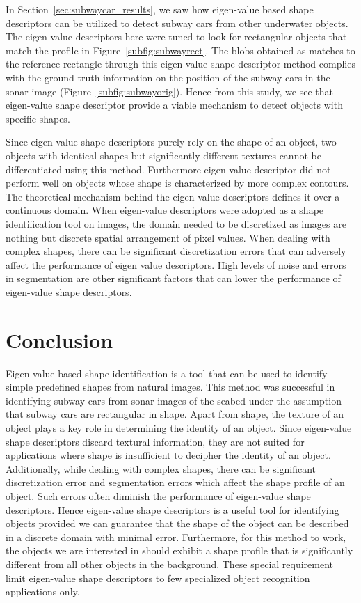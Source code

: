 \documentclass {udthesis}
\begin{document}
In Section~\ref{sec:subwaycar_results}, we saw how eigen-value based shape descriptors can be utilized to detect subway cars from other underwater objects. The eigen-value descriptors here were tuned to look for rectangular objects that match the profile in Figure~\ref{subfig:subwayrect}. The blobs obtained as matches to the reference rectangle through this eigen-value shape descriptor method complies with the ground truth information on the position of the subway cars in the sonar image (Figure~\ref{subfig:subwayorig}). Hence from this study, we see that eigen-value shape descriptor provide a viable mechanism to detect objects with specific shapes.

Since eigen-value shape descriptors purely rely on the shape of an object, two objects with identical shapes but significantly different textures cannot be differentiated using this method. Furthermore eigen-value descriptor did not perform well on objects whose shape is characterized by more complex contours. The theoretical mechanism behind the eigen-value descriptors defines it over a continuous domain. When eigen-value descriptors were adopted as a shape identification tool on images, the domain needed to be discretized as images are nothing but discrete spatial arrangement of pixel values. When dealing with complex shapes, there can be significant discretization errors that can adversely affect the performance of eigen value descriptors. High levels of noise and errors in segmentation are other significant factors that can lower the performance of eigen-value shape descriptors.


\section{Conclusion}

Eigen-value based shape identification is a tool that can be used to identify simple predefined shapes from natural images. This method was successful in identifying subway-cars from sonar images of the seabed under the assumption that subway cars are rectangular in shape. Apart from shape, the texture of an object plays a key role in determining the identity of an object. Since eigen-value shape descriptors discard textural information, they are not suited for applications where shape is insufficient to decipher the identity of an object. Additionally, while dealing with complex shapes, there can be significant discretization error and segmentation errors which affect the shape profile of an object. Such errors often diminish the performance of eigen-value shape descriptors. Hence eigen-value shape descriptors is a useful tool for identifying objects provided we can guarantee that the shape of the object can be described in a discrete domain with minimal error. Furthermore, for this method to work, the 
objects we are interested in should exhibit a shape profile that is significantly different from all other objects in the background. These special requirement limit eigen-value shape descriptors to few specialized object recognition applications only.

\printglossary[type=\acronymtype]                  
\end{document}
